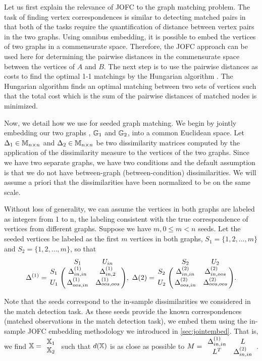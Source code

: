 \documentclass[12pt,oneside,final]{thesis}\usepackage[]{graphicx}\usepackage[]{color}
\begin{document}
Let us first explain the relevance of JOFC to the graph matching problem. The  task of finding vertex correspondences is similar to  detecting matched pairs in that both of the tasks require the quantification of distance between vertex pairs  in the two graphs.
Using omnibus  embedding, it is possible to embed the vertices of two graphs in a commensurate space.
Therefore, the JOFC approach can be used here for determining the pairwise distances in the commensurate space between  the vertices of $A$ and $B$.
The next step is to use the pairwise distances as costs to find the optimal 1-1 matchings by the Hungarian algorithm \cite{Hung-algo}. The Hungarian algorithm finds an optimal matching between two sets of vertices such that the total  cost which is the sum of the pairwise distances of matched nodes is minimized.

Now, we detail how we use for seeded graph matching. We begin by jointly embedding our two graphs , $\mathbb{G}_1$ and $\mathbb{G}_2$, into a common Euclidean space. Let $\Delta_1\in \mathbb{M}_{n \times n}$ and $\Delta_2\in \mathbb{M}_{n \times n}$ be two dissimilarity matrices computed by the application of the dissimilarity measure to the vertices of the two graphs. Since we have two separate graphs, we have two conditions and the default assumption is that we do not have  between-graph (between-condition) dissimilarities. We will assume a priori that the dissimilarities have been normalized to be on the same scale.

Without loss of generality, we can assume the vertices in both graphs are labeled as integers  from 1 to n, the labeling consistent with the true correspondence  of vertices from different graphs. Suppose we have $m, 0 \leq m <n$ seeds. Let the seeded vertices be labeled  as the first $m$ vertices in both graphs, $S_1=\{1,2,\ldots,m\}$ and $S_2=\{1,2,\ldots,m\}$, so that 
$$\Delta^{(1)}=\bordermatrix{&S_{1}&U_{in}\cr
                S_1&\gD^{(1)}_{{in},{in}} 
                & \gD^{(1)}_{{in},2}  \cr
                U_1& \gD^{(1)}_{{oos},{in}}  
                &  \gD^{(1)}_{{oos},{oos}}},\,\,
                \Delta{(2)}=\bordermatrix{&S_2&U_2\cr
                S_2&\gD^{(2)}_{{in},{in}} 
                & \gD^{(2)}_{{in},{oos}}  \cr
                U_2& \gD^{(2)}_{{oos},{in}}  
                &  \gD^{(2)}_{{oos},{oos}}}.$$


Note that the seeds correspond to the in-sample dissimilarities we considered in the match detection task. As these seeds provide the known correspondences (matched observations in the match detection task), we embed them using the in-sample JOFC embedding methodology we introduced in \ref{sec:jointembed}. That is, we find $\mathbb{X}= \begin{array}{c}
\mathbb{X}_1 \\
\mathbb{X}_2
\end{array}$ such that $d(\mathbb{X})$ is as close as possible to $M= \begin{array}{cc}
{\Delta}^{(1)}_{in,in} & L \\
 L^T &{\Delta}^{(2)}_{in,in}
\end{array}  $.
\end{document}
